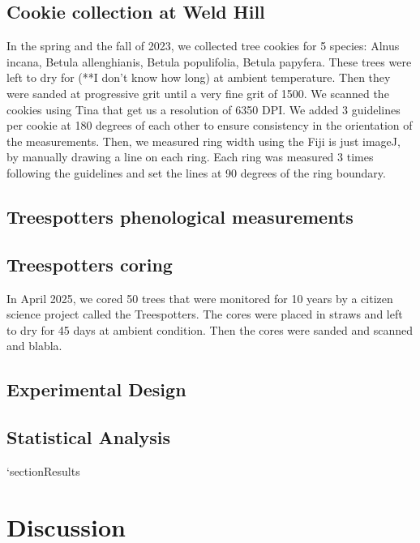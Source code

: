 \documentclass{article}
\begin{document}
\subsection{Cookie collection at Weld Hill}
In the spring and the fall of 2023, we collected tree cookies for 5 species: Alnus incana, Betula allenghianis, Betula populifolia, Betula papyfera. These trees were left to dry for (**I don't know how long) at ambient temperature. Then they were sanded at progressive grit until a very fine grit of 1500. We scanned the cookies using Tina that get us a resolution of 6350 DPI. We added 3 guidelines per cookie at 180 degrees of each other to ensure consistency in the orientation of the measurements. Then, we measured ring width using the Fiji is just imageJ, by manually drawing a line on each ring. Each ring was measured 3 times following the guidelines and set the lines at 90 degrees of the ring boundary. 

\subsection {Treespotters phenological measurements}

\subsection {Treespotters coring}
In April 2025, we cored 50 trees that were monitored for 10 years by a citizen science project called the Treespotters. The cores were placed in straws and left to dry for 45 days at ambient condition. Then the cores were sanded and scanned and blabla. 

\subsection{Experimental Design}

\subsection{Statistical Analysis}
`section{Results}
\section{Discussion}

\printbibliography
\end{document}
